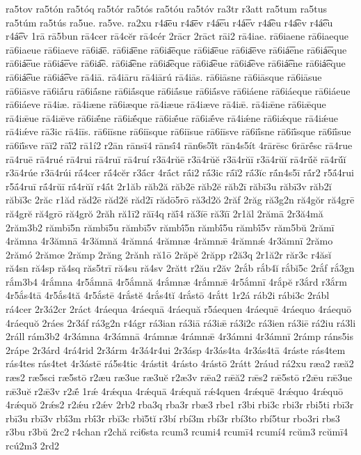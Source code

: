 {ra5tov
ra5tón
ra5tóq
ra5tór
ra5tós
ra5tóu
ra5tóv
ra3tr
r3att
ra5tum
ra5tus
ra5túm
ra5tús
ra5ue.
ra5ve.
ra2xu
r4a͞eu
r4a͞ev
r4á͞eu
r4á͞ev
r4a͡eu
r4a͡ev
r4á͡eu
r4á͡ev
1rā
rā5bun
rā4cer
rā4cĕr
rā4cér
2rācr
2rāct
rāi2
rā4iae.
rā6iaene
rā6iaeque
rā6iaeue
rā6iaeve
rā6ia͞e.
rā6ia͞ene
rā6ia͞eque
rā6ia͞eue
rā6ia͞eve
rā6iá͞ene
rā6iá͞eque
rā6iá͞eue
rā6iá͞eve
rā6ia͡e.
rā6ia͡ene
rā6ia͡eque
rā6ia͡eue
rā6ia͡eve
rā6iá͡ene
rā6iá͡eque
rā6iá͡eue
rā6iá͡eve
rā4iā.
rā4iāru
rā4iārú
rā4iās.
rā6iāsne
rā6iāsque
rā6iāsue
rā6iāsve
rā6iā́ru
rā6iā́sne
rā6iā́sque
rā6iā́sue
rā6iā́sve
rā6iáene
rā6iáeque
rā6iáeue
rā6iáeve
rā4iæ.
rā4iæne
rā6iæque
rā4iæue
rā4iæve
rā4iǣ.
rā4iǣne
rā6iǣque
rā4iǣue
rā4iǣve
rā6iǣ́ne
rā6iǣ́que
rā6iǣ́ue
rā6iǣ́ve
rā4iǽne
rā6iǽque
rā4iǽue
rā4iǽve
rā3ic
rā4iīs.
rā6iīsne
rā6iīsque
rā6iīsue
rā6iīsve
rā6iī́sne
rā6iī́sque
rā6iī́sue
rā6iī́sve
rāĭ2
rāĭ́2
rā1í2
r2ān
rānsī4
rānsī́4
rān6s5ĭ́t
rān4s5ít
4rārēsc
6rārḗsc
rā4rue
rā4ruē
rā4rué
rā4rui
rā4ruī
rā4ruí
r3ā4rŭē
r3ā4rŭĕ
r3ā4rŭī
r3ā4rŭĭ
rā4rŭ́ĕ
rā4rŭ́ĭ
r3ā4rúe
r3ā4rúi
rā́4cer
rā́4cĕr
r3ā́cr
4rā́ct
rā́i2
rā́3ic
rā́ĭ2
rā́3ĭc
rā́n4s5ī
rā́r2
r5ā́4rui
r5ā́4ruī
rā́4rŭī
rā́4rŭĭ
r4ā́t
2r1ăb
răb2ă
răb2ē
răb2ĕ
răb2ī
răbī3u
răbī3v
răb2ĭ
răbĭ3c
2răc
r1ăd
răd2ē
răd2ĕ
răd2ī
rădō5rō
ră3d2ŏ
2răf
2răg
ră3g2n
ră4gŏr
ră4grē
ră4grĕ
ră4grō
ră4grŏ
2răh
ră1ī2
răī4q
răī́4
ră3ĭē
ră3ĭī
2r1ăl
2rămā
2r3ă4mă
2răm3b2
rămbī5n
rămbī5u
rămbī5v
rămbī́5n
rămbī́5u
rămbī́5v
răm5bŭ
2rămī
4rămna
4r3ămnā
4r3ămnă
4rămná
4rămnæ
4rămnǣ
4rămnǽ
4r3ămnī
2rămo
2rămó
2rămœ
2rămp
2răng
2rănh
ră1ō
2răpĕ
2răpp
r2ă3q
2r1ă2r
răr3c
r4ăsĭ
ră4sn
ră4sp
ră4sq
răs5trī
ră4su
ră4sv
2rătt
r2ău
r2ăv
2rắb
rắb4ĭ
rắbĭ5c
2rắf
rắ3gn
rắm3b4
4rắmna
4r5ắmnā
4r5ắmnă
4rắmnæ
4rắmnǣ
4r5ắmnī
4rắpĕ
r3ắrd
r3ắrm
4r5ắs4tā
4r5ắs4tă
4r5ắstē
4rắstĕ
4rắs4tĭ
4rắstō
4rắtt
1r2á
ráb2i
rábi3c
2rábl
rá4cer
2r3á2cr
2ráct
4ráequa
4ráequā
4ráequă
r5áequen
4ráequē
4ráequo
4ráequō
4ráequŏ
2ráes
2r3áf
rá3g2n
r4ágr
rá3ian
rá3iā
rá3iǣ
rá3i2c
rá3ien
rá3iē
rá2iu
rá3li
2ráll
rám3b2
4r3ámna
4r3ámnā
4rámnæ
4rámnǣ
4r3ámni
4r3ámnī
2rámp
ráns5is
2rápe
2r3árd
4rá4rid
2r3árm
4r3á4r4ui
2r3ásp
4r3ás4ta
4r3ás4tā
4ráste
rás4tem
rás4tes
rás4tet
4r3ástē
rá5s4tic
4rástit
4rásto
4rástō
2rátt
2ráud
rá2xu
ræa2
ræă2
ræs2
ræ5sci
ræ5stō
r2æu
ræ3ue
ræ3uĕ
r2æ3v
rǣa2
rǣă2
rǣs2
rǣ5stō
r2ǣu
rǣ3ue
rǣ3uĕ
r2ǣ3v
r2ǣ́
1rǽ
4rǽqua
4rǽquā
4rǽquă
rǽ4quen
4rǽquē
4rǽquo
4rǽquō
4rǽquŏ
2rǽs2
r2ǽu
r2ǽv
2rb2
rba3q
rba3r
rbæ3
rbe1
r3bi
rbi3c
rbi3r
rbi5ti
rbī3r
rbī3u
rbī3v
rbī́3m
rbī́3r
rbĭ3c
rbĭ5tĭ
r3bí
rbí3m
rbí3r
rbí3to
rbí5tur
rbo3ri
rbs3
r3bu
r3bŭ
2rc2
r4chan
r2chă
rci6sta
rcum3
rcumi4
rcumī4
rcumí4
rcŭm3
rcŭmī4
rcú2m3
2rd2
}
